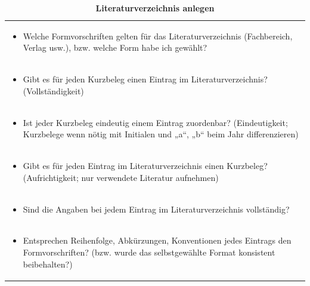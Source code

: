 \documentclass[]{book}
\providecommand{\tightlist}{%
  \setlength{\itemsep}{0pt}\setlength{\parskip}{0pt}}
\theoremstyle{definition}
\theoremstyle{definition}
\theoremstyle{definition}
\theoremstyle{remark}
\begin{document}
\begin{longtable}[]{@{}l@{}}
\caption{\textbf{\label{tab:literaturverzeichnis} Literaturverzeichnis
anlegen}}\tabularnewline
\toprule
\begin{minipage}[t]{0.97\columnwidth}\raggedright\strut
\begin{itemize}
\tightlist
\item
  Welche Formvorschriften gelten für das Literaturverzeichnis
  (Fachbereich, Verlag usw.), bzw. welche Form habe ich gewählt?
  \vspace{-6mm}
\end{itemize}\strut
\end{minipage}\tabularnewline
\begin{minipage}[t]{0.97\columnwidth}\raggedright\strut
\begin{itemize}
\tightlist
\item
  Gibt es für jeden Kurzbeleg einen Eintrag im Literaturverzeichnis?
  (Vollständigkeit) \vspace{-6mm}
\end{itemize}\strut
\end{minipage}\tabularnewline
\begin{minipage}[t]{0.97\columnwidth}\raggedright\strut
\begin{itemize}
\tightlist
\item
  Ist jeder Kurzbeleg eindeutig einem Eintrag zuordenbar?
  (Eindeutigkeit; Kurzbelege wenn nötig mit Initialen und „a``, „b``
  beim Jahr differenzieren) \vspace{-6mm}
\end{itemize}\strut
\end{minipage}\tabularnewline
\begin{minipage}[t]{0.97\columnwidth}\raggedright\strut
\begin{itemize}
\tightlist
\item
  Gibt es für jeden Eintrag im Literaturverzeichnis einen Kurzbeleg?
  (Aufrichtigkeit; nur verwendete Literatur aufnehmen) \vspace{-6mm}
\end{itemize}\strut
\end{minipage}\tabularnewline
\begin{minipage}[t]{0.97\columnwidth}\raggedright\strut
\begin{itemize}
\tightlist
\item
  Sind die Angaben bei jedem Eintrag im Literaturverzeichnis
  vollständig? \vspace{-6mm}
\end{itemize}\strut
\end{minipage}\tabularnewline
\begin{minipage}[t]{0.97\columnwidth}\raggedright\strut
\begin{itemize}
\tightlist
\item
  Entsprechen Reihenfolge, Abkürzungen, Konventionen jedes Eintrags den
  Formvorschriften? (bzw. wurde das selbstgewählte Format konsistent
  beibehalten?)
\end{itemize}\strut
\end{minipage}\tabularnewline
\bottomrule
\end{longtable}
\end{document}
